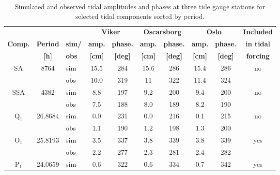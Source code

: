 \begin{table}[htb] 
	\caption{\small Simulated and observed tidal amplitudes and phases at three tide gauge stations for selected tidal components sorted by period.} 
	\label{tab:Tide} 
	\centering 
	\begin{tabular}{|c|c|l|cc|cc|cc|c|} 
\hline  
	  &	&	& \multicolumn{2}{|c|}{\small \bf Viker} & \multicolumn{2}{|c|}{\small \bf Oscarsborg} & \multicolumn{2}{|c|}{\small \bf Oslo} & {\small \bf Included} \\  
{\small \bf Comp.} & {\small \bf Period} & {\small \bf sim/} & {\small \bf amp.} & {\small \bf phase.} & {\small \bf amp.} & {\small \bf phase.} & {\small \bf amp.} & {\small \bf phase.} & {\small \bf in tidal} \\ 
	    & {\small \bf [h]} & {\small \bf obs} & {\small \bf [cm]} & {\small \bf [deg]} & {\small \bf [cm]} & {\small \bf [deg]} & {\small \bf [cm]}   & {\small \bf [deg]} & {\small \bf forcing} \\ \hline 
\small SA   & \small 8764    & \small sim & \small 15.5 & \small 284 & \small 15.6 & \small 286 & \small 15.4 & \small 286 & \small no  \\
\small      &        	     & \small obs & \small 10.0 & \small 319 & \small 11   & \small 322 & \small 11.4 & \small 324 &    	\\
\hline
\small SSA  & \small 4382    & \small sim & \small 8.8  & \small 197 & \small 9.2  & \small 200 & \small 9.4  & \small 200 & \small no  \\
\small      &		     & \small obs & \small 7.5  & \small 188 & \small 8.0  & \small 189 & \small 8.2  & \small 190 &    	\\
\hline
\small Q$_1$& \small 26.8684 & \small sim & \small 0.0  & \small 231 & \small 0.0  & \small 216 & \small 0.1  & \small 215 & \small no	\\
\small      &        	     & \small obs & \small 1.1  & \small 190 & \small 1.2  & \small 198 & \small 1.3  & \small 200 &    	\\
\hline
\small O$_1$& \small 25.8193 & \small sim & \small 3.5  & \small 337 & \small 3.8  & \small 339 & \small 3.8  & \small 339 & \small yes	\\
\small      &        	     & \small obs & \small 2.2  & \small 277 & \small 2.3  & \small 281 & \small 2.4  & \small 282 &    	\\
\hline
\small P$_1$& \small 24.0659 & \small sim & \small 0.6  & \small 322 & \small 0.6  & \small 334 & \small 0.7  & \small 342 & \small yes	\\

\end{tabular}
\end{table}
